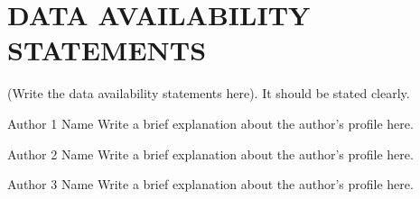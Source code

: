 \documentclass[preprint]{oscmjournal}
\begin{document}
\section*{DATA AVAILABILITY STATEMENTS}
(Write the data availability statements here). It should be stated clearly.

\printbibliography[title={REFERENCES}]

\begin{biography}{Author 1 Name}
    Write a brief explanation about the author’s profile here.
\end{biography}

\begin{biography}{Author 2 Name}
    Write a brief explanation about the author’s profile here.
\end{biography}

\begin{biography}{Author 3 Name}
    Write a brief explanation about the author’s profile here.
\end{biography}
\end{document}
